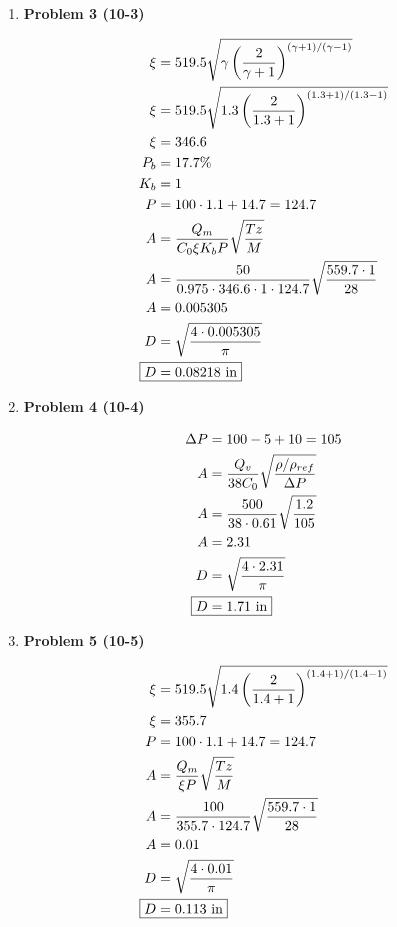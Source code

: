 \documentclass[12pt]{article}
\begin{document}
\begin{enumerate}
    \newpage
    \item \textbf{Problem 3 (10-3)}
    
    \begin{align*}
        \xi &= 519.5 \sqrt{\gamma \left(\frac{2}{\gamma + 1}\right)^{\left(\gamma+1\right)/\left(\gamma-1\right)}} \\
        \xi &= 519.5 \sqrt{1.3 \left(\frac{2}{1.3 + 1}\right)^{\left(1.3+1\right)/\left(1.3-1\right)}} \\
        \xi &= 346.6 \\
        P_b &= 17.7 \% \\
        K_b &= 1 \\
        P &= 100 \cdot 1.1 + 14.7 = 124.7 \\
        A &= \frac{Q_m}{C_0 \xi K_b P} \sqrt{\frac{T z}{M}} \\ 
        A &= \frac{50}{0.975 \cdot 346.6 \cdot 1 \cdot 124.7} \sqrt{\frac{559.7 \cdot 1}{28}} \\
        A &= 0.005305 \\ 
        D &= \sqrt{\frac{4 \cdot 0.005305}{\pi}} \\
        \Aboxed{D &= 0.08218 \text{ in}}
    \end{align*}

    \newpage
    \item \textbf{Problem 4 (10-4)}
    
    \begin{align*}
        \Delta P &= 100 - 5 + 10 = 105 \\
        A &= \frac{Q_v}{38 C_0} \sqrt{\frac{\rho/\rho_{ref}}{\Delta P}} \\
        A &= \frac{500}{38 \cdot 0.61} \sqrt{\frac{1.2}{105}} \\
        A &= 2.31 \\
        D &= \sqrt{\frac{4 \cdot 2.31}{\pi}} \\
        \Aboxed{D &= 1.71 \text{ in}}
    \end{align*}

    \newpage
    \item \textbf{Problem 5 (10-5)}
    
    \begin{align*}
        \xi &= 519.5 \sqrt{1.4 \left(\frac{2}{1.4 + 1}\right)^{\left(1.4+1\right)/\left(1.4-1\right)}} \\
        \xi &= 355.7 \\
        P &= 100 \cdot 1.1 + 14.7 = 124.7 \\
        A &= \frac{Q_m}{\xi P} \sqrt{\frac{Tz}{M}} \\
        A &= \frac{100}{355.7 \cdot 124.7} \sqrt{\frac{559.7 \cdot 1}{28}} \\
        A &= 0.01 \\
        D &= \sqrt{\frac{4 \cdot 0.01}{\pi}} \\
        \Aboxed{D &= 0.113 \text{ in}}
    \end{align*}
    
\end{enumerate}
\end{document}
